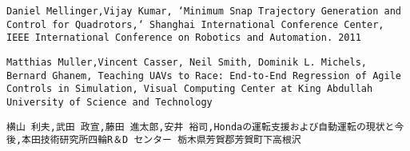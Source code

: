 \begin{thebibliography}{99}
  \texttt{Daniel Mellinger,Vijay Kumar, `Minimum Snap Trajectory Generation and Control for Quadrotors,` Shanghai International Conference Center, IEEE International Conference on Robotics and Automation. 2011}

  \texttt{Matthias Muller,Vincent Casser, Neil Smith, Dominik L. Michels, Bernard Ghanem, Teaching UAVs to Race: End-to-End Regression of Agile Controls in Simulation, Visual Computing Center at King Abdullah University of Science and Technology}

  \texttt{横山 利夫,武田 政宣,藤田 進太郎,安井 裕司,Hondaの運転支援および自動運転の現状と今後,本田技術研究所四輪R＆D センター 栃木県芳賀郡芳賀町下高根沢}

\end{thebibliography}
